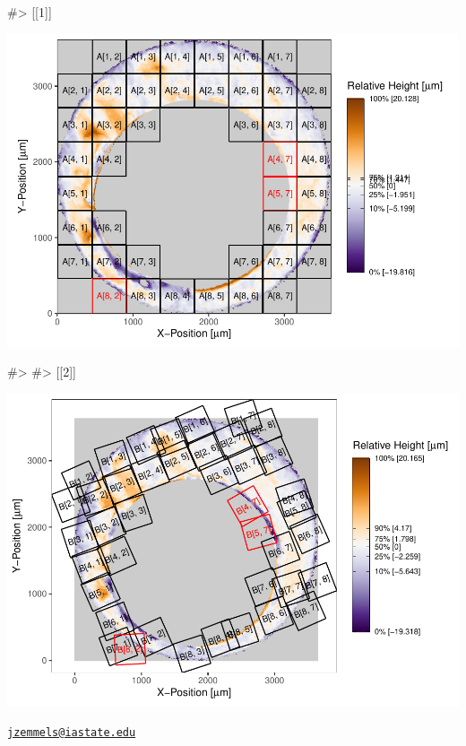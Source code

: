 \begin{Schunk}
\begin{Soutput}
#> [[1]]
\end{Soutput}

\includegraphics{cmcR_files/figure-latex/unnamed-chunk-12-1} \begin{Soutput}
#> 
#> [[2]]
\end{Soutput}

\includegraphics{cmcR_files/figure-latex/unnamed-chunk-12-2} 
\end{Schunk}




\address{%
Joseph Zemmels\\
Iowa State University Department of Statistics\\
2438 Osborn Dr\\ Ames, IA 50011\\
}
\href{mailto:jzemmels@iastate.edu}{\nolinkurl{jzemmels@iastate.edu}}

